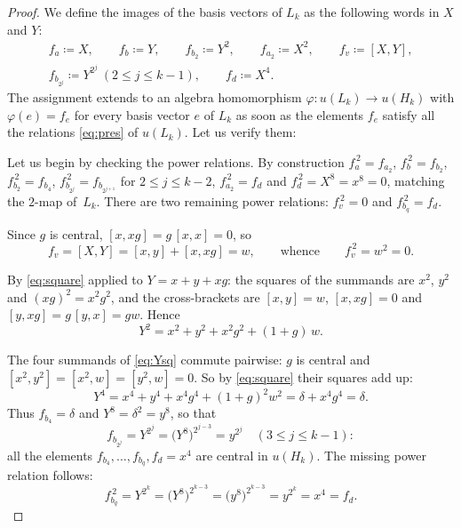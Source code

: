 \documentclass[10pt,a4paper]{amsart}
\begin{document}
\begin{proof}
	We define the images of the basis vectors of $L_k$ as the following words in $X$ and $Y$:
\begin{gather*}
f_a\coloneqq X,\qquad f_b\coloneqq Y,\qquad f_{b_2}\coloneqq Y^2,\qquad f_{a_2}\coloneqq X^2,\qquad
f_v\coloneqq [X,Y],\\
f_{b_{2^j}}\coloneqq Y^{2^j}\ (2\le j\le k-1),\qquad f_d\coloneqq X^4 .
\end{gather*}
The assignment extends to an
algebra homomorphism $\varphi\colon u(L_k)\to u(H_k)$ with $\varphi(e)=f_e$
for every basis vector $e$ of $L_k$ as soon as the elements $f_e$ satisfy all
the relations \eqref{eq:pres} of $u(L_k)$. Let us verify them:

Let us begin by checking the power relations. By construction $f_a^{\,2}=f_{a_2}$,
$f_b^{\,2}=f_{b_2}$, $f_{b_2}^{\,2}=f_{b_4}$,
$f_{b_{2^j}}^{\,2}=f_{b_{2^{j+1}}}$ for $2\le j\le k-2$,
$f_{a_2}^{\,2}=f_d$ and $f_d^{\,2}=X^8=x^8=0$, matching the $2$-map of~$L_k$. There are two remaining power relations: $f_v^{\,2}=0$ and
$f_{b_q}^{\,2}=f_d$.

Since $g$ is central, $[x,xg]=g\,[x,x]=0$, so
\[
f_v=[X,Y]=[x,y]+[x,xg]=w,
\qquad\text{whence}\qquad
f_v^{\,2}=w^2=0.
\]

By \eqref{eq:square} applied to $Y=x+y+xg$: the
squares of the summands are $x^2$, $y^2$ and $(xg)^2=x^2g^2$, and the
cross-brackets are $[x,y]=w$, $[x,xg]=0$ and $[y,xg]=g\,[y,x]=gw$. Hence
\begin{equation}\label{eq:Ysq}
Y^2=x^2+y^2+x^2g^2+(1+g)\,w .
\end{equation}

The four summands of \eqref{eq:Ysq} commute
pairwise: $g$ is central and $[x^2,y^2]=[x^2,w]=[y^2,w]=0$. So by \eqref{eq:square} their squares add up:
\[
Y^4=x^4+y^4+x^4g^4+(1+g)^2w^2=\delta+x^4g^4=\delta.
\]
Thus $f_{b_4}=\delta$ and
$Y^8=\delta^2=y^8$, so that
\[
f_{b_{2^j}}=Y^{2^j}=\bigl(Y^8\bigr)^{2^{j-3}}=y^{2^j}\quad(3\le j\le k-1):
\]
all the elements $f_{b_4},\dots,f_{b_q},f_d=x^4$ are central in $u(H_k)$. The
missing power relation follows:
\[
f_{b_q}^{\,2}=Y^{2^k}=\bigl(Y^{8}\bigr)^{2^{k-3}}
=\bigl(y^{8}\bigr)^{2^{k-3}}=y^{2^k}=x^4=f_d.
\]


\end{proof}
\end{document}
